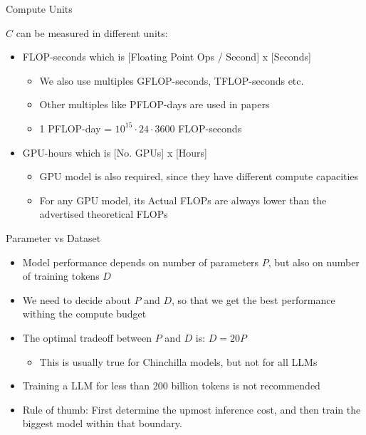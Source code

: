 
\begin{vbframe}{Compute Units}

\vfill

$C$  can be measured in different units:\newline

\begin{itemize}
    \item FLOP-seconds which is [Floating Point Ops / Second] x [Seconds]
	\begin{itemize}
	    \item We also use multiples GFLOP-seconds, TFLOP-seconds etc.
		\item Other multiples like PFLOP-days are used in papers
		\item 1 PFLOP-day = $10^{15} \cdot 24 \cdot 3600$ FLOP-seconds
	\end{itemize}
	\item GPU-hours which is [No. GPUs] x [Hours]
	\begin{itemize}
	    \item GPU model is also required, since they have different compute capacities
		\item For any GPU model, its Actual FLOPs are always lower than the advertised theoretical FLOPs
	\end{itemize}
\end{itemize}

\vfill

\end{vbframe}


\begin{vbframe}{Parameter vs Dataset}

\vfill

\begin{itemize}
    \item Model performance depends on number of parameters $P$, but also on number of training tokens $D$
	\item We need to decide about $P$ and $D$, so that we get the best performance withing the compute budget
	\item The optimal tradeoff between $P$ and $D$ is: $D = 20 P$
	\begin{itemize}
	    \item This is usually true for Chinchilla models, but not for all LLMs
	\end{itemize}
	\item Training a LLM for less than 200 billion tokens is not recommended
	\item Rule of thumb: First determine the upmost inference cost, and then train the biggest model within that boundary.
\end{itemize}

\vfill

\end{vbframe}

